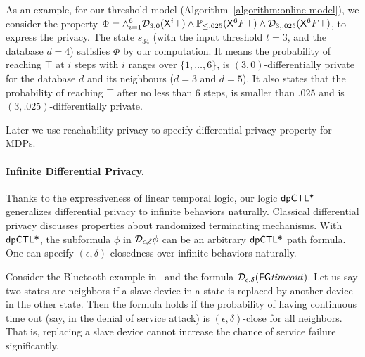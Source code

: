 As an example, for our threshold model (Algorithm~\ref{algorithm:online-model}), we consider the property $\Phi=\wedge_{i=1}^{6} \mathcal{D}_{{3}, {0}}(\mathsf{X}^i \top) \wedge \mathbb{P}_{\le .025}(\mathsf{X}^6 F \top) \wedge \mathcal{D}_{{3}, {.025}}(\mathsf{X}^6 F \top)$, to express the privacy. The state $s_{34}$ (with the input threshold $t=3$, and the database $d=4$) satisfies $\Phi$ by our computation. It means the probability of reaching $\top$ at $i$ steps with $i$ ranges over $\{1,\ldots,6\}$, is $(3, 0)$-differentially private for the database $d$ and its neighbours ($d=3$ and $d=5$). It also states that the probability of reaching $\top$ after no less than $6$ steps, is smaller than $.025$ and is  $(3, .025)$-differentially private.

Later we use reachability privacy to specify differential privacy property for MDPs.

\paragraph{Infinite Differential Privacy.}
Thanks to the expressiveness of linear temporal logic, our logic $\textsf{dpCTL*}$ generalizes differential privacy to infinite
behaviors naturally. Classical differential privacy discusses properties about
randomized terminating mechanisms.
With $\textsf{dpCTL*}$, the subformula $\phi$ in $\mathcal{D}_{{\epsilon}, {\delta}} \phi$
can be an arbitrary $\textsf{dpCTL*}$ path formula. One can specify
$(\epsilon, \delta)$-closedness over infinite behaviors naturally.

Consider the Bluetooth example in~\cite{DKNP04} and the
formula $\mathcal{D}_{{\epsilon}, {\delta}}{(\mathsf{F} \mathsf{G} \mathit{timeout})}$. Let us say
two states are neighbors if a slave device in a state is replaced by
another device in the other state.
Then the formula holds if the probability of having
continuous time out (say, in the denial of service attack) is
$(\epsilon, \delta)$-close for all neighbors. That is, replacing a slave
device cannot increase the chance of service failure significantly.

